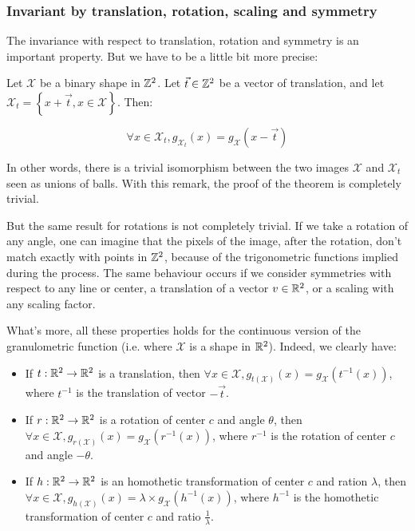\subsubsection{Invariant by translation, rotation, scaling and symmetry}

The invariance with respect to translation, rotation and symmetry is an important property. But we have to be a little bit more precise:

\begin{theoreme}
	Let $\mathcal{X}$ be a binary shape in $\mathbb{Z}^{2}$. Let $\vec{t} \in \mathbb{Z}^{2}$ be a vector of translation, and let $\mathcal{X}_{t} = \left\{ x + \vec{t}, x \in \mathcal{X} \right\}$. Then:
	
	$$ \forall x \in \mathcal{X}_{t}, g_{\mathcal{X}_{t}}(x) = g_{\mathcal{X}}(x-\vec{t}) $$
\end{theoreme}

In other words, there is a trivial isomorphism between the two images $\mathcal{X}$ and  $\mathcal{X}_t$ seen as unions of balls. With this remark, the proof of the theorem is completely trivial.

But the same result for rotations is not completely trivial. If we take a rotation of any angle, one can imagine that the pixels of the image, after the rotation, don't match exactly with points in $\mathbb{Z}^{2}$, because of the trigonometric functions implied during the process. The same behaviour occurs if we consider symmetries with respect to any line or center, a translation of a vector $v \in \mathbb{R}^2$, or a scaling with any scaling factor.


What's more, all these properties holds for the continuous version of the granulometric function (i.e. where $\mathcal{X}$ is a shape in $\mathbb{R}^2$). Indeed, we clearly have:

\begin{remarque}
	\begin{itemize}
		\item If $t : \mathbb{R}^2 \to \mathbb{R}^2$ is a translation, then $\forall x \in \mathcal{X}, g_{t(\mathcal{X})}(x) = g_{\mathcal{X}}(t^{-1}(x))$, where $t^{-1}$ is the translation of vector $-\vec{t}$.
		\item If $r : \mathbb{R}^2 \to \mathbb{R}^2$ is a rotation of center $c$ and angle $\theta$, then $\forall x \in \mathcal{X}, g_{r(\mathcal{X})}(x) = g_{\mathcal{X}}(r^{-1}(x))$, where $r^{-1}$ is the rotation of center $c$ and angle $-\theta$. 
		\item If $h : \mathbb{R}^2 \to \mathbb{R}^2$ is an homothetic transformation of center $c$ and ration $\lambda$, then $\forall x \in \mathcal{X}, g_{h(\mathcal{X})}(x) = \lambda \times g_{\mathcal{X}}(h^{-1}(x))$, where $h^{-1}$ is the homothetic transformation of center $c$ and ratio $\frac{1}{\lambda}$.
	\end{itemize}
\end{remarque}


